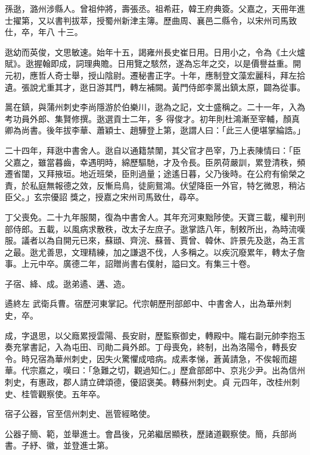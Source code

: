 \begin{pinyinscope}
 孫逖，潞州涉縣人。曾祖仲將，壽張丞。祖希莊，韓王府典簽。父嘉之，天冊年進士擢第，又以書判拔萃，授蜀州新津主簿。歷曲周、襄邑二縣令，以宋州司馬致仕，卒，年八
 十三。



 逖幼而英俊，文思敏速。始年十五，謁雍州長史崔日用。日用小之，令為《土火爐賦》。逖握翰即成，詞理典贍。日用覽之駭然，遂為忘年之交，以是價譽益重。開元初，應哲人奇士舉，授山陰尉。遷秘書正字。十年，應制登文藻宏麗科，拜左拾遺。張說尤重其才，逖日游其門，轉左補闕。黃門侍郎李暠出鎮太原，闢為從事。



 暠在鎮，與蒲州刺史李尚隱游於伯樂川，逖為之記，文士盛稱之。二十一年，入為考功員外郎、集賢修撰。逖選貢士二年，多
 得俊才。初年則杜鴻漸至宰輔，顏真卿為尚書。後年拔李華、蕭穎士、趙驊登上第，逖謂人曰：「此三人便堪掌綸誥。」



 二十四年，拜逖中書舍人。逖自以通籍禁闈，其父官才邑宰，乃上表陳情曰：「臣父嘉之，雖當暮齒，幸遇明時，綿歷驅馳，才及令長。臣夙荷嚴訓，累登清秩，頻遷省闥，又拜掖垣。地近班榮，臣則過量；途遙日暮，父乃後時。在公府有偷榮之責，於私庭無報德之效，反慚烏鳥，徒廁鴛鴻。伏望降臣一外官，特乞微恩，稍沾臣父。」玄宗優詔
 獎之，授嘉之宋州司馬致仕，尋卒。



 丁父喪免。二十九年服闋，復為中書舍人。其年充河東黜陟使。天寶三載，權判刑部侍郎。五載，以風病求散秩，改太子左庶子。逖掌誥八年，制敕所出，為時流嘆服。議者以為自開元已來，蘇頲、齊浣、蘇晉、賈曾、韓休、許景先及逖，為王言之最。逖尤善思，文理精練，加之謙退不伐，人多稱之。以疾沉廢累年，轉太子詹事。上元中卒。廣德二年，詔贈尚書右僕射，謚曰文。有集三十卷。



 子宿、絳、成。逖弟遹、遘、造。



 遹終左
 武衛兵曹。宿歷河東掌記。代宗朝歷刑部郎中、中書舍人，出為華州刺史，卒。



 成，字退思，以父廕累授雲陽、長安尉，歷監察御史，轉殿中。隴右副元帥李抱玉奏充掌書記，入為屯田、司勛二員外郎。丁母喪免，終制，出為洛陽令，轉長安令。時兄宿為華州刺史，因失火驚懼成喑病。成素孝悌，蒼黃請急，不俟報而趨華。代宗嘉之，嘆曰：「急難之切，觀過知仁。」歷倉部郎中、京兆少尹。出為信州刺史，有惠政，郡人請立碑頌德，優詔褒美。轉蘇州刺史。貞
 元四年，改桂州刺史、桂管觀察使。五年卒。



 宿子公器，官至信州刺史、邕管經略使。



 公器子簡、範，並舉進士。會昌後，兄弟繼居顯秩，歷諸道觀察使。簡，兵部尚書。子紓、徽，並登進士第。



\end{pinyinscope}